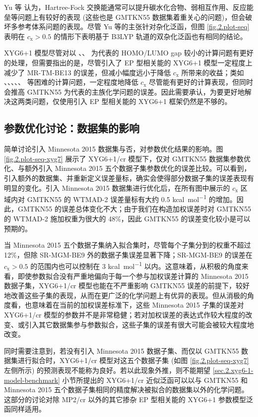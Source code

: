 Yu 等\cite{Yu-Truhlar.CS.2016} 认为，Hartree-Fock 交换能通常可以提升碳水化合物、弱相互作用、反应能垒等问题上有较好的表现 (这些也是 GMTKN55 数据集着重关心的问题)，但会破坏多参考体系问题的表现。尽管 Yu 等的主张针对杂化泛函，但图 \ref{fig.2.plot-seq} 表明在 $c_\mathrm{x} > 0.5$ 的情形下表明基于 B3LYP 轨道的双杂化泛函也有相同的结论。

XYG6+1 模型尽管对以 、、 为代表的 HOMO/LUMO gap 较小的计算问题有更好的处理，但需要指出的是，尽管引入了 EP 型相关能的 XYG6+1 模型一定程度上减少了 MR-TM-BE13 的误差，但减小幅度远小于降低 $c_\mathrm{x}$ 所带来的收益；类如 、、、、、 等困难的计算问题，一定程度地降低 $c_\mathrm{x}$ 尽管能有更好的计算表现，但同时会推高 GMTKN55 为代表的主族化学问题的误差。因此需要承认，为要更好地解决这两类问题，仅使用引入 EP 型相关能的 XYG6+1 框架仍然是不够的。

\subsection{参数优化讨论：数据集的影响}
\label{sec.2.propotion-dataset}

简单讨论引入 Minnesota 2015 数据集与否，对参数优化结果的影响。图 \ref{fig.2.plot-seq-xyg7} 展示了 XYG6+1/cr 模型下，仅对 GMTKN55 数据集参数优化、与额外引入 Minnesota 2015 五个数据子集参数优化的误差比较。可以看到，引入额外的数据集、并重新定义误差量标，确实会使得部分数据子集的误差表现有明显的变化。引入 Minnesota 2015 数据集进行优化后，在所有图中展示的 $c_\mathrm{x}$ 区域内对 GMTKN55 的 WTMAD-2 误差量标有大约 0.5 \si{kcal.mol^{-1}} 的增加。因此，GMTKN55 的误差总体变化不大；由于我们在构造加权误差时对 GMTKN55 的 WTMAD-2 施加权重为很大的 48\%，因此 GMTKN55 的误差变化较小是可以预期的。

当 Minnesota 2015 五个数据子集纳入拟合集时，尽管每个子集分到的权重不超过 12\%，但除 SR-MGM-BE9 外的数据子集误差显著下降；SR-MGM-BE9 的误差在 $c_\mathrm{x} > 0.5$ 的范围内也可以控制在 3 \si{kcal.mol^{-1}} 以内。这意味着，从积极的角度来看，即使参数拟合没有严重地偏向于每一个参与加权误差计算的 Minnesota 2015 数据子集，XYG6+1/cr 模型也能在不严重影响 GMTKN55 误差的前提下，较好地改善这些子集的表现，从而在更广泛的化学问题上有优异的表现。但从消极的角度看，也意味着在当前的加权误差标准下，这些 Minnesota 2015 子集的误差对 XYG6+1/cr 模型的参数并不是非常稳健；若对加权误差的表达式作较大程度的改变、或引入其它数据集参与参数拟合，这些子集的误差有很大可能会被较大程度地改变。

同时需要注意到，若没有引入 Minnesota 2015 数据子集、而仅以 GMTKN55 数据集进行拟合时，XYG6+1/cr 模型对这五个数据子集 (如图 \ref{fig.2.plot-seq-xyg7} 左侧所示) 的预测表现不能称为良好。若以此现象外推，则不能期望 \ref{sec.2.xyg6-1-model-benchmark} 小节所提出的 XYG6+1/cr 近似泛函可以以与 GMTKN55 和 Minnesota 2015 五个数据子集相同的精度解决被拟合的数据集以外的化学问题。这部分的讨论对除 MP2/cr 以外的其它掺杂 EP 型相关能的 XYG6+1 参数模型泛函同样适用。

